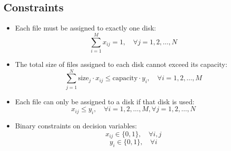 \documentclass{article}
\begin{document}
\subsection*{Constraints}
\begin{itemize}
    \item Each file must be assigned to exactly one disk:
    \[
    \sum_{i=1}^{M} x_{ij} = 1, \quad \forall j = 1, 2, \ldots, N
    \]
    
    \item The total size of files assigned to each disk cannot exceed its capacity:
    \[
    \sum_{j=1}^{N} \text{size}_j \cdot x_{ij} \leq \text{capacity} \cdot y_i, \quad \forall i = 1, 2, \ldots, M
    \]

    \item Each file can only be assigned to a disk if that disk is used:
    \[
    x_{ij} \leq y_i, \quad \forall i = 1, 2, \ldots, M, \forall j = 1, 2, \ldots, N
    \]

    \item Binary constraints on decision variables:
    \[
    x_{ij} \in \{0, 1\}, \quad \forall i, j
    \]
    \[
    y_i \in \{0, 1\}, \quad \forall i
    \]
\end{itemize}
\end{document}
